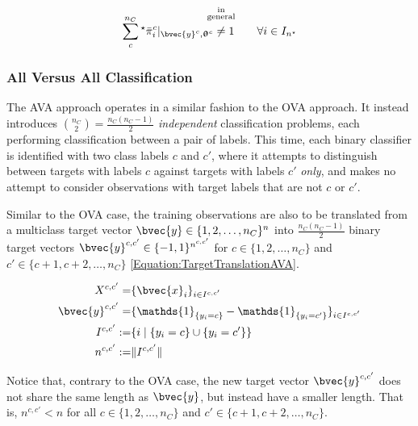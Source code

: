 				\begin{equation}
					\sum_{c}^{n_{C}} {^{\star}}\bar{\pi}^{c}_{i} |_{\bvec{y}^{c}, \vec{\uptheta}^{c}} \stackrel{\mathclap{\substack{\text{in} \\ \text{general} \\ \quad }}}{\neq} 1 \qquad \forall i \in I_{n^{\star}}
				\label{Equation:ProbabilityInconsistencyOVA}
				\end{equation}
				
			\subsubsection{All Versus All Classification}
			\label{BenthicHabitatMapping:Classification:MulticlassClassification:AVA}
			
				The AVA approach operates in a similar fashion to the OVA approach. It instead introduces ${n_{C} \choose 2} = \frac{n_{C} (n_{C} - 1)}{2}$ \textit{independent} classification problems, each performing classification between a pair of labels. This time, each binary classifier is identified with two class labels $c$ and $c'$, where it attempts to distinguish between targets with labels $c$ against targets with labels $c'$ \textit{only}, and makes no attempt to consider observations with target labels that are not $c$ or $c'$. 
				
				Similar to the OVA case, the training observations are also to be translated from a multiclass target vector $\bvec{y} \in \{1, 2, \dots, n_{C}\}^{n}$ into $\frac{n_{C} (n_{C} - 1)}{2}$ binary target vectors $\bvec{y}^{c, c'} \in \{-1, 1\}^{n^{c, c'}}$ for $c \in \{1, 2, \dots, n_{C}\}$ and $c' \in \{c + 1, c + 2, \dots, n_{C}\}$ \eqref{Equation:TargetTranslationAVA}.
								
				\begin{equation}
					\begin{aligned}
						X^{c, c'} =& \{\bvec{x}_{i}\}_{i \in I^{c, c'}} \\
						\bvec{y}^{c, c'} =& \{\mathds{1}_{\{y_{i} = c\}} - \mathds{1}_{\{y_{i} = c'\}}\}_{i \in I^{c, c'}} \\
						I^{c, c'} :=& \{i \; | \; \{y_{i} = c\} \cup \{y_{i} = c'\} \} \\
						n^{c, c'} :=& \Vert I^{c, c'} \Vert
					\end{aligned}
				\label{Equation:TargetTranslationAVA}
				\end{equation}				
				
				Notice that, contrary to the OVA case, the new target vector $\bvec{y}^{c, c'}$ does not share the same length as $\bvec{y}$, but instead have a smaller length. That is, $n^{c, c'} < n$ for all $c \in \{1, 2, \dots, n_{C}\}$ and $c' \in \{c + 1, c + 2, \dots, n_{C}\}$.
				
